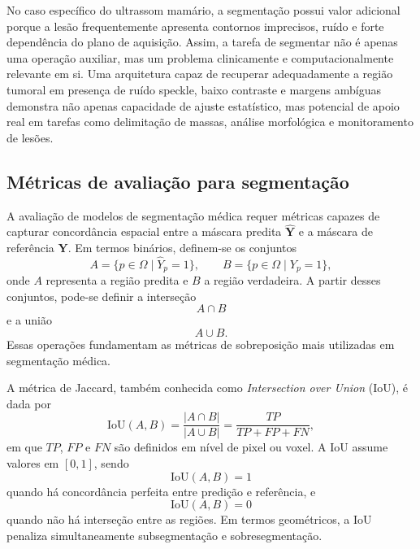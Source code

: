 \documentclass[tcc,capa]{texufpel}
\begin{document}
No caso específico do ultrassom mamário, a segmentação possui valor adicional porque a lesão frequentemente apresenta contornos imprecisos, ruído e forte dependência do plano de aquisição. Assim, a tarefa de segmentar não é apenas uma operação auxiliar, mas um problema clinicamente e computacionalmente relevante em si. Uma arquitetura capaz de recuperar adequadamente a região tumoral em presença de ruído speckle, baixo contraste e margens ambíguas demonstra não apenas capacidade de ajuste estatístico, mas potencial de apoio real em tarefas como delimitação de massas, análise morfológica e monitoramento de lesões.

\subsection{Métricas de avaliação para segmentação}

A avaliação de modelos de segmentação médica requer métricas capazes de capturar concordância espacial entre a máscara predita \(\hat{\mathbf{Y}}\) e a máscara de referência \(\mathbf{Y}\). Em termos binários, definem-se os conjuntos
\begin{equation}
	A = \{p \in \Omega \mid \hat{Y}_p = 1\},
	\qquad
	B = \{p \in \Omega \mid Y_p = 1\},
\end{equation}
onde \(A\) representa a região predita e \(B\) a região verdadeira. A partir desses conjuntos, pode-se definir a interseção
\begin{equation}
	A \cap B
\end{equation}
e a união
\begin{equation}
	A \cup B.
\end{equation}
Essas operações fundamentam as métricas de sobreposição mais utilizadas em segmentação médica.

A métrica de Jaccard, também conhecida como \textit{Intersection over Union} (IoU), é dada por
\begin{equation}
	\mathrm{IoU}(A,B)
	=
	\frac{|A \cap B|}{|A \cup B|}
	=
	\frac{TP}{TP + FP + FN},
\end{equation}
em que \(TP\), \(FP\) e \(FN\) são definidos em nível de pixel ou voxel. A IoU assume valores em \([0,1]\), sendo
\begin{equation}
	\mathrm{IoU}(A,B)=1
\end{equation}
quando há concordância perfeita entre predição e referência, e
\begin{equation}
	\mathrm{IoU}(A,B)=0
\end{equation}
quando não há interseção entre as regiões. Em termos geométricos, a IoU penaliza simultaneamente subsegmentação e sobresegmentação.
\end{document}

